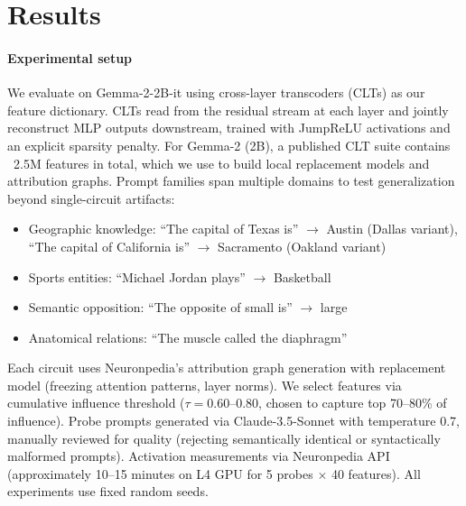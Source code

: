 
\section{Results}
\label{sec:results}

\paragraph{Experimental setup}
We evaluate on Gemma-2-2B-it using cross-layer transcoders (CLTs) as our feature dictionary. CLTs read from the residual stream at each layer and jointly reconstruct MLP outputs downstream, trained with JumpReLU activations and an explicit sparsity penalty. For Gemma-2 (2B), a published CLT suite contains ~2.5M features in total, which we use to build local replacement models and attribution graphs. Prompt families span multiple domains to test generalization beyond single-circuit artifacts:

\begin{itemize}
  \item Geographic knowledge: ``The capital of Texas is'' $\rightarrow$ Austin (Dallas variant), ``The capital of California is'' $\rightarrow$ Sacramento (Oakland variant)
  \item Sports entities: ``Michael Jordan plays'' $\rightarrow$ Basketball  
  \item Semantic opposition: ``The opposite of small is'' $\rightarrow$ large
  \item Anatomical relations: ``The muscle called the diaphragm''
\end{itemize}

Each circuit uses Neuronpedia's attribution graph generation with replacement model (freezing attention patterns, layer norms). We select features via cumulative influence threshold ($\tau = 0.60$--0.80, chosen to capture top 70--80\% of influence). Probe prompts generated via Claude-3.5-Sonnet with temperature 0.7, manually reviewed for quality (rejecting semantically identical or syntactically malformed prompts). Activation measurements via Neuronpedia API (approximately 10--15 minutes on L4 GPU for 5 probes $\times$ 40 features). All experiments use fixed random seeds.

